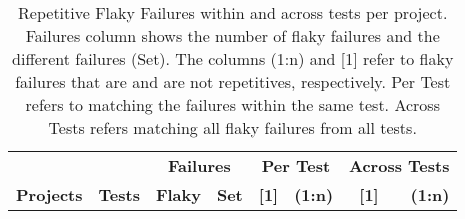 







\begin{table}[t]
  \setlength{\tabcolsep}{2.5pt}

\caption[Repetitive Flaky Failures within and across tests per project]{Repetitive Flaky Failures within and across tests per project. \\
\textnormal{Failures column shows the number of flaky failures and the different failures (Set). The columns (1:n) and [1] refer to flaky failures that are and are not repetitives, respectively.  Per Test refers to matching the failures within the same test. Across Tests refers matching all flaky failures from all tests.}
}
\label{table:repetitive}
\vspace{-4pt}
\footnotesize
\centering
\begin{tabular}{l|r|rr|rr|rr}

\toprule
      & &\multicolumn{2}{c|}{\textbf{Failures}} & \multicolumn{2}{c|}{\textbf{Per Test}} & \multicolumn{2}{c}{\textbf{Across Tests}}\\
      

\textbf{Projects} & \textbf{Tests} & \textbf{Flaky}  & \textbf{Set}  & \textbf{[1]} & \textbf{(1:n)}  & \textbf{[1]} & \textbf{(1:n)} \\
\midrule


\end{tabular}
\end{table}
